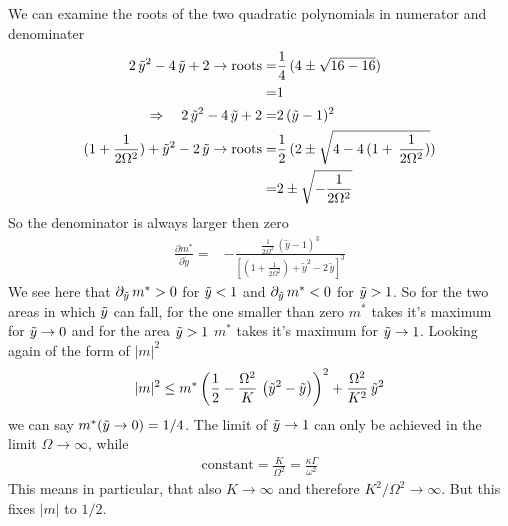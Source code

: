 \documentclass{article}
\begin{document}
We can examine the roots of the two quadratic polynomials in numerator and denominater
\begin{align*}
    2\,\tilde{y}^2-4\,\tilde{y}+2\rightarrow\text{roots}=&\frac{1}{4}\,(4\pm\sqrt{16-16})\\
    =&1\\
    \Rightarrow\quad 2\,\tilde{y}^2-4\,\tilde{y}+2=&2\,(\tilde{y}-1)^2\\
    (1+\frac{1}{2\Omega^2})+\tilde{y}^2-2\,\tilde{y}\rightarrow\text{roots}=&\frac{1}{2}\,(2\pm\sqrt{4-4\,(1+\,\frac{1}{2\Omega^2})})\\
    =&2\pm\sqrt{-\frac{1}{2\Omega^2}}
\end{align*}
So the denominator is always larger then zero
\begin{align*}
    \frac{\partial m^*}{\partial\tilde{y}}=&-\frac{\frac{1}{2\Omega^2}\,(\tilde{y}-1)^3}{\left[(1+\frac{1}{2\Omega^2})+\tilde{y}^2-2\,\tilde{y}\right]^3}
\end{align*}
We see here that $\partial_{\tilde{y}}\,m^*>0$ for $\tilde{y}<1$ and $\partial_{\tilde{y}}\,m^*<0$ for $\tilde{y}>1$. So for the two areas in which $\tilde{y}$ can fall, for the one smaller than zero $m^*$ takes it's maximum for $\tilde{y}\rightarrow0$ and for the area $\tilde{y}>1$ $m^*$ takes it's maximum for $\tilde{y}\rightarrow1$. Looking again of the form of $|m|^2$ 
\begin{align*}
    |m|^2\leq m^*\left( \frac{1}{2}-\frac{\Omega^2}{K}\,\left( \tilde{y}^2- \tilde{y} \right) \right)^2+\frac{\Omega^2}{K^2}\,\tilde{y}^2
\end{align*}
we can say $m^*(\tilde{y}\rightarrow0)=1/4$. The limit of $\tilde{y}\rightarrow1$ can only be achieved in the limit $\Omega\rightarrow\infty$, while%
\begin{align*}
    \text{constant}=\frac{K}{\Omega^2}=\frac{\kappa\Gamma}{\omega^2}
\end{align*}
This means in particular, that also $K\rightarrow\infty$ and therefore $K^2/\Omega^2\rightarrow\infty$. But this fixes $|m|$ to $1/2$. 
\end{document}

